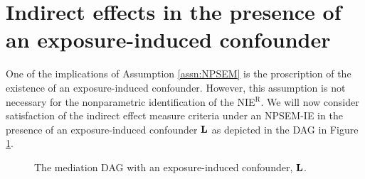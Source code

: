 \documentclass[12pt]{article}
\begin{document}
\section{Indirect effects in the presence of an exposure-induced confounder}
\label{sec:recanting-witness}
One of the implications of Assumption \ref{assn:NPSEM} is the proscription of the existence of an exposure-induced confounder. However, this assumption is not necessary for the nonparametric identification of the NIE$^{\text{R}}$. We will now consider satisfaction of the indirect effect measure criteria under an NPSEM-IE in the presence of an exposure-induced confounder ${\bf L}$ as depicted in the DAG in Figure \ref{fig:DAG2}.
\begin{figure}[h]
    \centering
    \caption{The mediation DAG with an exposure-induced confounder, ${\bf L}$.\label{fig:DAG2}}
\end{figure}
\begin{comment}
We define the nonparametric structural equation model with independent errors (NPSEM-IE) with respect to the DAG in Figure \ref{fig:DAG2}:
\begin{align*}
    {\bf C} &= {\bf f_C}(\varepsilon_C);
    A = f_A({\bf C}, \varepsilon_A);
    {\bf L} = {\bf f_L}({\bf C}, A, \varepsilon_L);\\
    M &= f_M({\bf C}, A, {\bf L}, \varepsilon_M);
    Y = f_Y({\bf C}, A, {\bf L}, M, \varepsilon_Y),
\end{align*}
where $\varepsilon_C, \varepsilon_A$, $\varepsilon_L$, $\varepsilon_M$, $\varepsilon_Y$ are all mutually independent. 
\end{comment}
\end{document}
